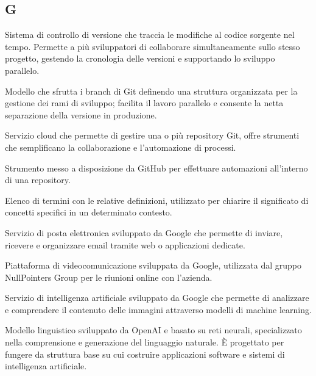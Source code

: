 \begin{center}
\section*{G}
\end{center}

Sistema di controllo di versione che traccia le modifiche al codice sorgente nel tempo. Permette a più sviluppatori di collaborare simultaneamente sullo stesso progetto, gestendo la cronologia delle versioni e supportando lo sviluppo parallelo.

Modello che sfrutta i branch di Git definendo una struttura organizzata per la gestione dei rami di sviluppo; facilita il lavoro parallelo e consente la netta separazione della versione in produzione.

Servizio cloud che permette di gestire una o più repository Git, offre strumenti che semplificano la collaborazione e l'automazione di processi.

Strumento messo a disposizione da GitHub per effettuare automazioni all'interno di una repository.

Elenco di termini con le relative definizioni, utilizzato per chiarire il significato di concetti specifici in un determinato contesto.

Servizio di posta elettronica sviluppato da Google che permette di inviare, ricevere e organizzare email tramite web o applicazioni dedicate.

Piattaforma di videocomunicazione sviluppata da Google, utilizzata dal gruppo NullPointers Group per le riunioni online con l'azienda.

Servizio di intelligenza artificiale sviluppato da Google che permette di analizzare e comprendere il contenuto delle immagini attraverso modelli di machine learning.

Modello linguistico sviluppato da OpenAI e basato su reti neurali, specializzato nella comprensione e generazione del linguaggio naturale. È progettato per fungere da struttura base su cui costruire applicazioni software e sistemi di intelligenza artificiale.

